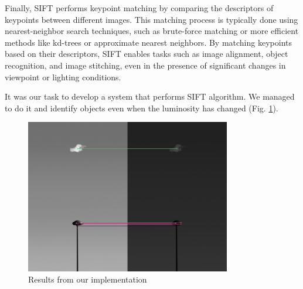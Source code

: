 \documentclass[12pt]{article}
\begin{document}
\clearpage

Finally, SIFT performs keypoint matching by comparing the descriptors of keypoints between different images. This matching process is typically done using nearest-neighbor search techniques, such as brute-force matching or more efficient methods like kd-trees or approximate nearest neighbors. By matching keypoints based on their descriptors, SIFT enables tasks such as image alignment, object recognition, and image stitching, even in the presence of significant changes in viewpoint or lighting conditions.

It was our task to develop a system that performs SIFT algorithm. We managed to do it and identify objects even when the luminosity has changed (Fig. \ref{fig:results}).

\begin{figure}[H]
    \centering
    \includegraphics[width=0.8\textwidth]{img/final.png}
    \caption{Results from our implementation}
    \label{fig:results}
\end{figure}

\nocite{*}

\clearpage

\printbibliography
\end{document}

